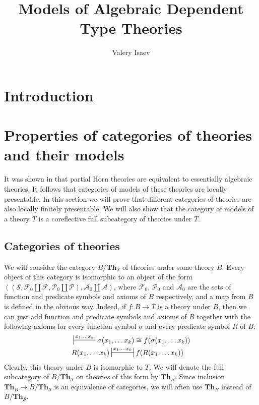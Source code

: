 \documentclass[reqno]{amsart}
\theoremstyle{definition}
\theoremstyle{remark}
\newcommand{\cat}[1]{\mathbf{#1}}
\newcommand{\Th}{\cat{Th}}
\numberwithin{figure}{section}
\begin{document}
\title{Models of Algebraic Dependent Type Theories}

\author{Valery Isaev}

\begin{abstract}
\end{abstract}

\maketitle

 \makeatletter
    \providecommand\@dotsep{5}
  \makeatother
  \listoftodos\relax

\section{Introduction}

\section{Properties of categories of theories and their models}

It was shown in \cite{PHL} that partial Horn theories are equivalent to essentially algebraic theories.
It follows that categories of models of these theories are locally presentable.
In this section we will prove that different categories of theories are also locally finitely presentable.
We will also show that the category of models of a theory $T$ is a coreflective full subcategory of theories under $T$.

\subsection{Categories of theories}

We will consider the category $B/\Th_\mathcal{S}$ of theories under some theory $B$.
Every object of this category is isomorphic to an object of the form
$((\mathcal{S}, \mathcal{F}_0 \amalg \mathcal{F}, \mathcal{P}_0 \amalg \mathcal{P}), \mathcal{A}_0 \amalg \mathcal{A})$,
where $\mathcal{F}_0$, $\mathcal{P}_0$ and $\mathcal{A}_0$ are the sets of function and predicate symbols and axioms of $B$ respectively,
and a map from $B$ is defined in the obvious way.
Indeed, if $f : B \to T$ is a theory under $B$, then we can just add function and predicate symbols and axioms of $B$
together with the following axioms for every function symbol $\sigma$ and every predicate symbol $R$ of $B$:
\begin{align*}
& \sststile{}{x_1, \ldots x_k} \sigma(x_1, \ldots x_k) \cong f(\sigma(x_1, \ldots x_k)) \\
& R(x_1, \ldots x_k) \ssststile{}{x_1, \ldots x_k} f(R(x_1, \ldots x_k))
\end{align*}
Clearly, this theory under $B$ is isomorphic to $T$.
We will denote the full subcategory of $B/\Th_\mathcal{S}$ on theories of this form by $\Th_B$.
Since inclusion $\Th_B \to B/\Th_\mathcal{S}$ is an equivalence of categories, we will often use $\Th_B$ instead of $B/\Th_\mathcal{S}$.
\end{document}
